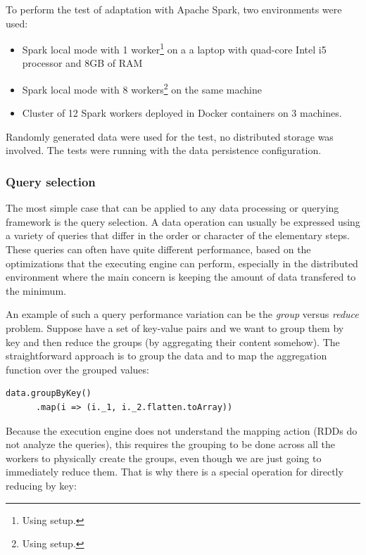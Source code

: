 To perform the test of adaptation with Apache Spark, two environments were used:

\begin{itemize}
	\item Spark local mode with 1 worker\footnote{Using  setup.} on a a laptop with quad-core Intel i5 processor and 8GB of RAM
	\item Spark local mode with 8 workers\footnote{Using  setup.} on the same machine
	\item Cluster of 12 Spark workers deployed in Docker containers on 3 machines. 	%
\end{itemize}

Randomly generated data were used for the test, no distributed storage was involved. The tests were running with the  data persistence configuration.

\subsubsection{Query selection}

The most simple case that can be applied to any data processing or querying framework is the query selection. A data operation can usually be expressed using a variety of queries that differ in the order or character of the elementary steps. These queries can often have quite different performance, based on the optimizations that the executing engine can perform, especially in the distributed environment where the main concern is keeping the amount of data transfered to the minimum.

An example of such a query performance variation can be the \textit{group} versus \textit{reduce} problem. Suppose have a set of key-value pairs and we want to group them by key and then reduce the groups (by aggregating their content somehow). The straightforward approach is to group the data and to map the aggregation function over the grouped values:

\lstset{style=Scala}
\begin{lstlisting}
data.groupByKey()
      .map(i => (i._1, i._2.flatten.toArray))
\end{lstlisting}

Because the execution engine does not understand the mapping action (RDDs do not analyze the queries), this requires the grouping to be done across all the workers to physically create the groups, even though we are just going to immediately reduce them. That is why there is a special operation for directly reducing by key:

